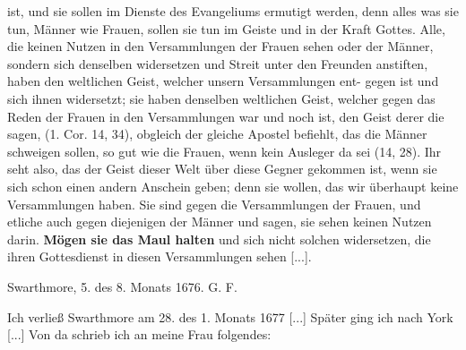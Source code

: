 {  ist, und sie sollen im Dienste des Evangeliums ermutigt werden,
  denn alles was sie tun, Männer wie Frauen, sollen sie tun im
  Geiste und in der Kraft Gottes. Alle, die keinen Nutzen in den
  Versammlungen der Frauen sehen oder der Männer, sondern sich
  denselben widersetzen und Streit unter den Freunden anstiften,
  haben den weltlichen Geist, welcher unsern Versammlungen ent-
  gegen ist und sich ihnen widersetzt; sie haben denselben weltlichen
  Geist, welcher gegen das Reden der Frauen in den Versammlungen
  war und noch ist, den Geist derer die sagen,  
  (1. Cor. 14, 34), obgleich der gleiche
  Apostel befiehlt, das die Männer schweigen sollen, so gut wie
  die Frauen, wenn kein Ausleger da sei (14, 28). 
  Ihr seht also,
  das der Geist dieser Welt über diese Gegner gekommen ist, wenn
  sie sich schon einen andern Anschein geben; denn sie wollen, das
  wir überhaupt keine Versammlungen haben. Sie sind gegen die
  Versammlungen der Frauen, und etliche auch gegen diejenigen
  der Männer und sagen, sie sehen keinen Nutzen darin. \textbf{Mögen
  sie das Maul halten} und 
  sich nicht solchen widersetzen, die ihren
  Gottesdienst in diesen Versammlungen sehen [...].
  \bigskip 
  \begin{flushright}Swarthmore, 5. des 8. Monats 
  1676. G. F.\end{flushright}
}

Ich verließ Swarthmore am 28. des 1. Monats 1677 [...]
Später ging ich nach York [...] Von da schrieb ich an meine
Frau folgendes:


